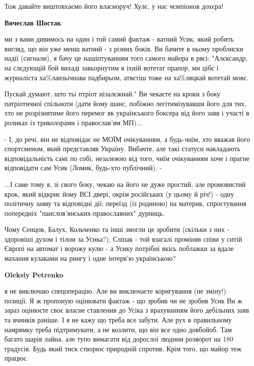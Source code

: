 \begin{itemize}
\begin{itemize}
Тож давайте виштовхаємо його власноруч! Хулє, у нас чємпіонов дохєра!

\textbf{Вячеслав Шостак} 

ми з вами дивимось на один і той самий фактаж - ватний Усик, який робить
вигляд, що він уже менш ватний - з різних боків. Ви бачите в ньому проблиски
надії (сигнали), я бачу це нашіптуванням того самого майора в рясі: "Алєксандр,
на слєдующій бой вихаді завьорнутим в іхній вотетат прапор, ми цібє і
журналіста ха\%лаизьічнава падбирьом, атвєтіш тоже на ха\%ляцкай вотетай мовє.

Пускай думают, што тьі птріот нізалєжнай." Ви чекаєте на кроки з боку
патріотичної спільноти (дати йому шанс, побіжно легітимізувавши його для тих,
хто не розрізнятиме його перемог як українського боксера від його заяв і участі
в роликах із триколорами і православ'ям МП)...

- І, до речі, він не відповідає не МОЇМ очікуванням, а будь-чиїм, хто вважав
його спортсменом, який представляв Україну. Вибачте, але такі статуси
накладають відповідальність самі по собі, незалежно від того, чиїм очікуванням
хоче і прагне відповідати сам Усик (Ломик, будь-хто публічний). -

...І саме тому я, зі свого боку, чекаю на його не дуже простий, але промовистий
крок, який відкриє йому ВСІ двері, окрім російських (у цьому й річ!) - одну
політичну заяву та відповідні дії: переїзд (із родиною) на материк,
спростування попередніх "панслов'янських-православних" дурниць.

Чому Сенцов, Балух, Кольченко та інші змогли це зробити (скільки з них -
здоровіші духом і тілом за Усика?), Сліпак - той взагалі проміняв співи у ситій
Європі на автомат і ворожу кулю - а Усику потрібні якісь поблажки за вдале
махання кулаками на рингу і одне інтерв'ю українською?

\textbf{Oleksiy Petrenko} 

\obeycr
я не виключаю спецоперацію. Але ви виключаєте коригування (не зміну!) позиції.
Я ж пропоную оцінювати фактаж - що зробив чи не зробив Усик
Ви ж зараз оцінюєте своє власне ставлення до Усіка з врахуванням його дебільних заяв та вчинків раніше.
І я не кажу що треба все забути. Але рух в правильному намрямку треба підтримувати, а не козлити, що він все одно довбойоб.
Там багато шарів лайна, але тупо вимагати від дорослої людини розворот на 180 градусів. Будь який тиск створює природній спротив.
Крім того, що майор теж працює.
\restorecr


\end{itemize}
\end{itemize}
